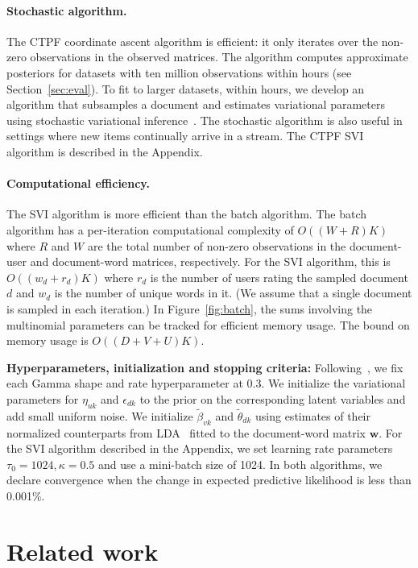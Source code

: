 \documentclass{article}
\newcommand{\mysec}[1]{Section~\ref{sec:#1}}
\newcommand{\myfig}[1]{Figure~\ref{fig:#1}}
\begin{document}
\paragraph{Stochastic algorithm.}
The CTPF coordinate ascent algorithm is efficient: it only iterates
over the non-zero observations in the observed matrices. The algorithm
computes approximate posteriors for datasets with ten million
observations within hours (see \mysec{eval}). To fit to larger
datasets, within hours, we develop an algorithm that subsamples a
document and estimates variational parameters using stochastic
variational inference~\cite{Hoffman:2013}. The stochastic algorithm is
also useful in settings where new items continually arrive in a
stream. The CTPF SVI algorithm is described in the Appendix.
 
\paragraph{Computational efficiency.} 
The SVI algorithm is more efficient than the batch algorithm. The
batch algorithm has a per-iteration computational complexity of $O((W
+ R)K)$ where $R$ and $W$ are the total number of non-zero
observations in the document-user and document-word matrices,
respectively. For the SVI algorithm, this is $O((w_d+r_d)K)$ where
$r_d$ is the number of users rating the sampled document $d$ and $w_d$
is the number of unique words in it. (We assume that a single document
is sampled in each iteration.) In \myfig{batch}, the sums involving
the multinomial parameters can be tracked for efficient memory
usage. The bound on memory usage is $O((D+V+U)K)$.

\textbf{Hyperparameters, initialization and stopping criteria:}
Following~\cite{Gopalan:2013b}, we fix each Gamma shape and rate
hyperparameter at 0.3. We initialize the variational parameters for
$\eta_{uk}$ and $\epsilon_{dk}$ to the prior on the corresponding
latent variables and add small uniform noise. We initialize
$\tilde{\beta}_{vk}$ and $\tilde{\theta}_{dk}$ using estimates of their normalized
counterparts from LDA~\cite{Blei:2003b} fitted to the document-word
matrix $\bm{w}$. For the SVI algorithm described in the Appendix, we
set learning rate parameters $\tau_0=1024,\kappa=0.5$ and use a
mini-batch size of 1024. In both algorithms, we declare convergence
when the change in expected predictive likelihood is less than
0.001\%.


\section{Related work}
\label{sec:related}
\end{document}
